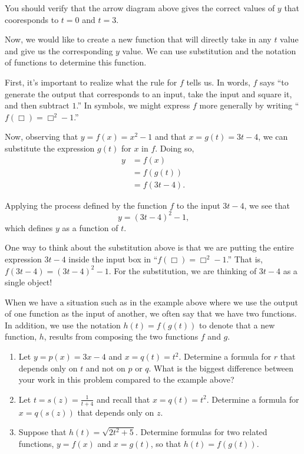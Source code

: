 \documentclass{ximera}
\begin{document}
\begin{example}
\begin{explanation}
You should verify that the arrow diagram above gives the correct values of $y$ that cooresponds to $t=0$ and $t=3$.

Now, we would like to create a new function that will directly take in any $t$ value and give us the corresponding $y$ value.  We can use substitution and the notation of functions to determine this function.

First, it's important to realize what the rule for $f$ tells us.  In words, $f$ says ``to generate the output that corresponds to an input, take the input and square it, and then subtract $1$.''  In symbols, we might express $f$ more generally by writing ``$f(\Box) = \Box^2 - 1$.''

Now, observing that $y = f(x) = x^2 - 1$ and that $x = g(t) = 3t - 4$, we can substitute the expression $g(t)$ for $x$ in $f$.  Doing so,%
\begin{align*}
y &= f(x)\\
&= f(g(t))\\
&= f(3t-4)\text{.}
\end{align*}

Applying the process defined by the function $f$ to the input $3t-4$, we see that%
\begin{equation*}
y = (3t-4)^2 - 1\text{,}
\end{equation*}
which defines $y$ as a function of $t$.

One way to think about the substitution above is that we are putting the entire expression $3t-4$ inside the input box in ``$f(\Box) = \Box^2 - 1$.''   That is, $f \left( \boxed{3t-4} \right) = \left( \boxed{3t-4} \right) ^2 -1$.  For the substitution, we are thinking of $3t-4$ as a single object! 

\end{explanation}
\end{example}

When we have a situation such as in the example above where we use the output of one function as the input of another, we often say that we have  two functions.  In addition, we use the notation $h(t) = f(g(t))$ to denote that a new function, $h$, results from composing the two functions $f$ and $g$.


\begin{exploration}
\begin{enumerate}[label=\alph*.]
\item Let $y = p(x) = 3x - 4$ and $x = q(t) = t^2$.   Determine a formula for $r$ that depends only on $t$ and not on $p$ or $q$.  What is the biggest difference between your work in this problem compared to the example above?
\item Let $t = s(z) = \frac{1}{t+4}$ and recall that $x = q(t) = t^2$.  Determine a formula for $x = q(s(z))$ that depends only on $z$.
\item Suppose that $h(t) = \sqrt{2t^2 + 5}$.  Determine formulas for two related functions, $y = f(x)$ and $x = g(t)$, so that $h(t) = f(g(t))$.
\end{enumerate}
\end{exploration}
\end{document}
